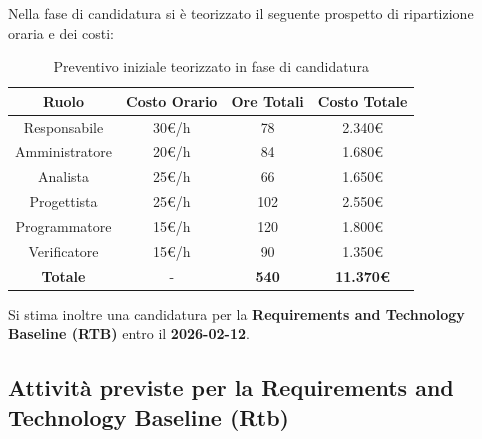 \documentclass[a4paper,12pt]{article}
\begin{document}
Nella fase di candidatura si è teorizzato il seguente prospetto di ripartizione oraria e dei costi:

\begin{table}[H]
    \centering
    \renewcommand{\arraystretch}{1.5}
    \begin{tabularx}{\textwidth}{|c|C|C|C|}
        \hline
        \textbf{Ruolo} & \textbf{Costo Orario} & \textbf{Ore Totali} & \textbf{Costo Totale} \\
        \hline
        Responsabile & 30€/h & 78 & 2.340\euro \\
        \hline
        Amministratore & 20€/h & 84 & 1.680\euro \\
        \hline
        Analista & 25€/h & 66 & 1.650\euro \\
        \hline
        Progettista & 25€/h & 102 & 2.550\euro \\
        \hline
        Programmatore & 15€/h & 120 & 1.800\euro \\
        \hline
        Verificatore & 15€/h & 90 & 1.350\euro \\
        \hline
        \textbf{Totale} & - & \textbf{540} & \textbf{ 11.370\euro } \\
        \hline
    \end{tabularx}
    \caption{Preventivo iniziale teorizzato in fase di candidatura}
    \label{tab:preventivo_candidatura}
\end{table}

Si stima inoltre una candidatura per la \textbf{Requirements and Technology Baseline (RTB)} entro il \textbf{2026-02-12}.

\subsection{Attività previste per la Requirements and Technology Baseline (Rtb)}
\end{document}
